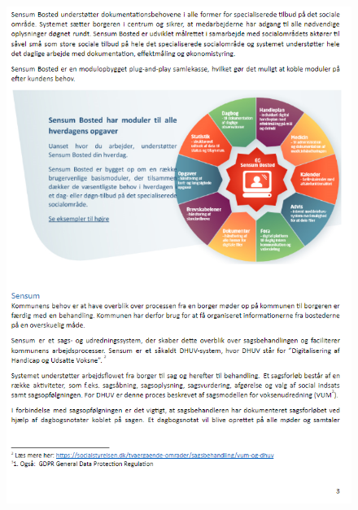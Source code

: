 \begin{figure}[hbt!]
\begin{center}
  \includegraphics[scale = 1]{./PNG/Case/Case_3.png} 
\end{center}
\end{figure}

